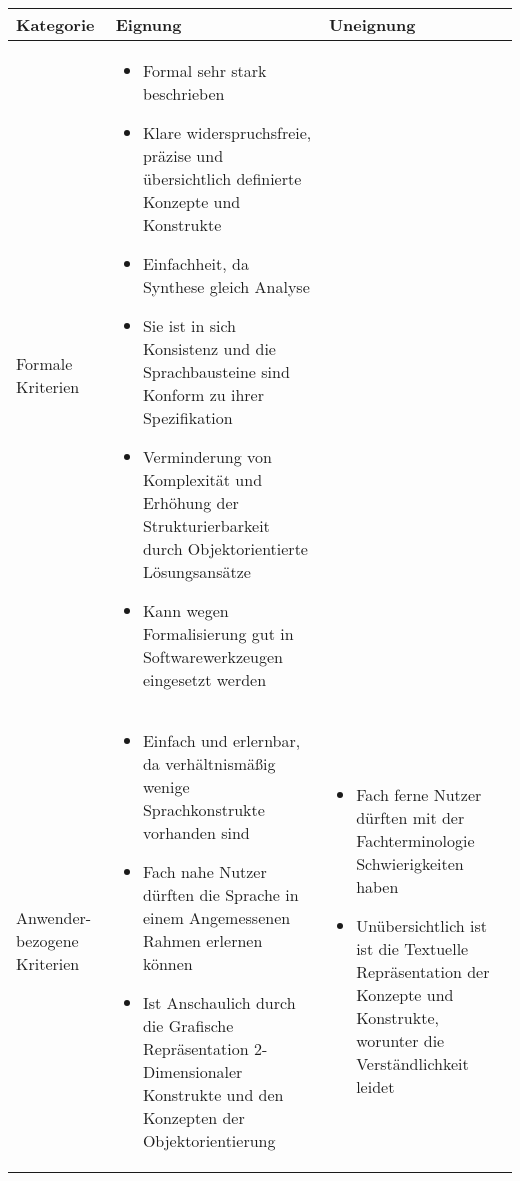\begin{tabularx}{\textwidth}{|p{2cm}|X|X|}
	\hline
	Kategorie & Eignung & Uneignung  \\
	\hline
	Formale Kriterien	&
	\begin{itemize}
		\item Formal sehr stark beschrieben
		\item Klare widerspruchsfreie, präzise und übersichtlich definierte Konzepte und Konstrukte
		\item Einfachheit, da Synthese gleich Analyse
		\item Sie ist in sich Konsistenz und die Sprachbausteine sind Konform zu ihrer Spezifikation
		\item Verminderung von Komplexität und Erhöhung der Strukturierbarkeit durch Objektorientierte Lösungsansätze
		\item Kann wegen Formalisierung gut in Softwarewerkzeugen eingesetzt werden
	\end{itemize} & \\
	\hline
	Anwender-bezogene Kriterien &
	\begin{itemize}
		\item Einfach und erlernbar, da verhältnismäßig wenige Sprachkonstrukte vorhanden sind
		\item Fach nahe Nutzer dürften die Sprache in einem Angemessenen Rahmen erlernen können
		\item Ist Anschaulich durch die Grafische Repräsentation 2-Dimensionaler Konstrukte und den Konzepten der Objektorientierung
		\end{itemize}  & 
	\begin{itemize}
		\item Fach ferne Nutzer dürften mit der Fachterminologie Schwierigkeiten haben
		\item Unübersichtlich ist ist die Textuelle Repräsentation der Konzepte und Konstrukte, worunter die Verständlichkeit leidet
	\end{itemize} \\
	\hline
\end{tabularx} 
